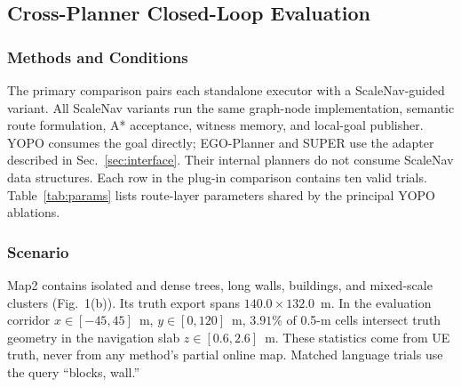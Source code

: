 \documentclass[letterpaper,10pt,conference]{ieeeconf}
\begin{document}
\subsection{Cross-Planner Closed-Loop Evaluation}
\subsubsection{Methods and Conditions}
The primary comparison pairs each standalone executor with a ScaleNav-guided
variant.  All ScaleNav variants run the same graph-node implementation,
semantic route formulation, A* acceptance, witness memory, and local-goal
publisher.  YOPO consumes the goal directly; EGO-Planner and SUPER use the
adapter described in Sec.~\ref{sec:interface}.  Their internal planners do not
consume ScaleNav data structures.  Each row in the plug-in comparison contains
ten valid trials.  Table~\ref{tab:params} lists route-layer parameters shared
by the principal YOPO ablations.

\begin{table}[t]
\caption{Fixed Parameters Used by the Current Implementation}
\label{tab:params}
\centering
\small
{}
\end{table}

\subsubsection{Scenario}
Map2 contains isolated and dense trees, long walls, buildings, and
mixed-scale clusters (Fig.~1(b)).  Its truth export spans
$140.0\times132.0$~m.  In the evaluation corridor $x\in[-45,45]$~m,
$y\in[0,120]$~m, $3.91\%$ of 0.5-m cells intersect truth geometry in the
navigation slab $z\in[0.6,2.6]$~m.  These statistics come from UE truth,
never from any method's partial online map.  Matched language trials
use the query ``blocks, wall.''
\end{document}
